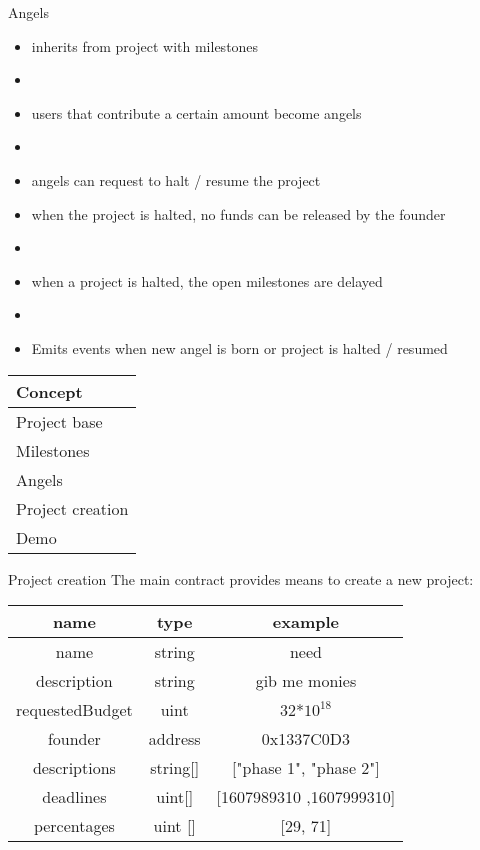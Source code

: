 \documentclass{beamer}
\begin{document}
\begin{frame}{Angels}
\begin{itemize}
    \item inherits from project with milestones
	\item[]
	\item users that contribute a certain amount become angels
	\item[]
	\item angels can request to halt / resume the project
	\item when the project is halted, no funds can be released by the founder
	\item[]
	\item when a project is halted, the open milestones are delayed
	\item[]
	\item Emits events when new angel is born or project is halted / resumed
\end{itemize}
\end{frame}




\begin{frame}
	\begin{tabularx}{\textwidth}{X}
		\hline
		Concept\\
		\hline
		Project base\\
		\hline
		Milestones\\
		\hline
		Angels\\
		\hline
		\rowcolor{hcolor}
		Project creation\\
		\hline
		Demo\\
		\hline
	\end{tabularx}
\end{frame}


\begin{frame}{Project creation}
The main contract provides means to create a new project:\\
\vspace{7mm}
\begin{center}
	\begin{tabular}{c|c||c}
		name & type & example \\
		\hline
		 name & string & need \\
		 description & string & gib me monies \\
		 requestedBudget & uint & 32*$10^{18}$ \\
		 founder & address & 0x1337C0D3 \\
		 descriptions & string[] & ["phase 1", "phase 2"] \\
		 deadlines & uint[] & [1607989310 ,1607999310] \\
		 percentages & uint [] & [29, 71] \\
	\end{tabular}
\end{center}
\end{frame}
\end{document}

